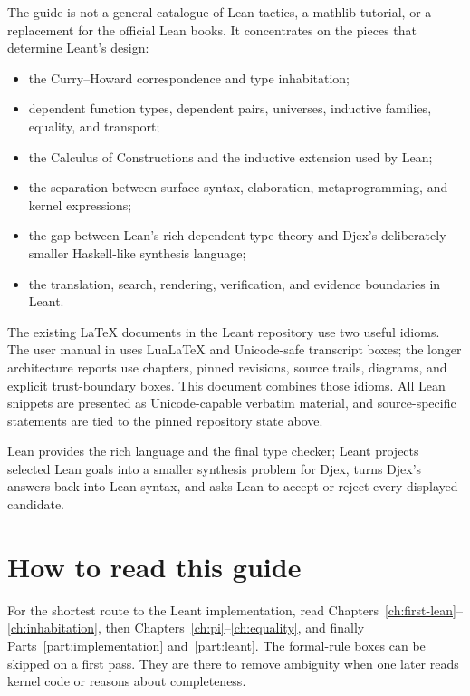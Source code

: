 \documentclass[10pt,letterpaper,oneside,openany]{report}
\begin{document}
The guide is not a general catalogue of Lean tactics, a mathlib tutorial, or a replacement for the official Lean books.  It concentrates on the pieces that determine Leant's design:

\begin{itemize}
\item the Curry--Howard correspondence and type inhabitation;
\item dependent function types, dependent pairs, universes, inductive families, equality, and transport;
\item the Calculus of Constructions and the inductive extension used by Lean;
\item the separation between surface syntax, elaboration, metaprogramming, and kernel expressions;
\item the gap between Lean's rich dependent type theory and Djex's deliberately smaller Haskell-like synthesis language;
\item the translation, search, rendering, verification, and evidence boundaries in Leant.
\end{itemize}

The existing LaTeX documents in the Leant repository use two useful idioms.  The user manual in  uses LuaLaTeX and Unicode-safe transcript boxes; the longer architecture reports use chapters, pinned revisions, source trails, diagrams, and explicit trust-boundary boxes.  This document combines those idioms.  All Lean snippets are presented as Unicode-capable verbatim material, and source-specific statements are tied to the pinned repository state above.

\begin{keyidea}
Lean provides the rich language and the final type checker; Leant projects selected Lean goals into a smaller synthesis problem for Djex, turns Djex's answers back into Lean syntax, and asks Lean to accept or reject every displayed candidate.
\end{keyidea}

\section*{How to read this guide}

For the shortest route to the Leant implementation, read Chapters~\ref{ch:first-lean}--\ref{ch:inhabitation}, then Chapters~\ref{ch:pi}--\ref{ch:equality}, and finally Parts~\ref{part:implementation} and~\ref{part:leant}.  The formal-rule boxes can be skipped on a first pass.  They are there to remove ambiguity when one later reads kernel code or reasons about completeness.
\end{document}
